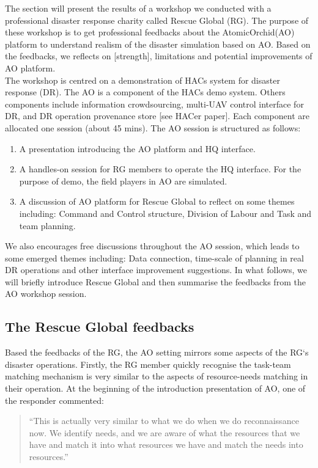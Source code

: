 The section will present the results of a workshop we conducted with a professional disaster response charity called Rescue Global (RG). The purpose of these workshop is to get professional feedbacks about the AtomicOrchid(AO) platform to understand realism of the disaster simulation based on AO. Based on the feedbacks, we reflects on [strength], limitations and potential improvements of AO platform. \\

The workshop is centred on a demonstration of HACs system for disaster response (DR). The AO is a component of the HACs demo system. Others components include information crowdsourcing, multi-UAV control interface for DR, and DR operation provenance store [see HACer paper]. Each component are allocated one session (about 45 mins). The AO session is structured as follows:\\

\begin{enumerate}
	\item A presentation introducing the AO platform and HQ interface.
	\item A handles-on session for RG members to operate the HQ interface. For the purpose of demo, the field players in AO are simulated.
	\item A discussion of AO platform for Rescue Global to reflect on some themes including: Command and Control structure, Division of Labour and Task and team planning.
\end{enumerate} 

We also encourages free discussions throughout the AO session, which leads to some emerged themes including: Data connection, time-scale of planning in real DR operations and other interface improvement suggestions. In what follows, we will briefly introduce Rescue Global and then summarise the feedbacks from the AO workshop session. 

\subsection{The Rescue Global feedbacks}
Based the feedbacks of the RG, the AO setting  mirrors some aspects of the RG`s disaster operations. Firstly, the RG member quickly recognise the task-team matching mechanism is very similar to the aspects of resource-needs matching in their operation. At the beginning of the introduction presentation of AO, one of the responder commented: \\

\begin{quotation}
``This is actually very similar to what we do when we do reconnaissance now. We identify needs, and we are aware of what the resources that we have and match it into what resources we have and match the needs into resources.''\\
\end{quotation}


